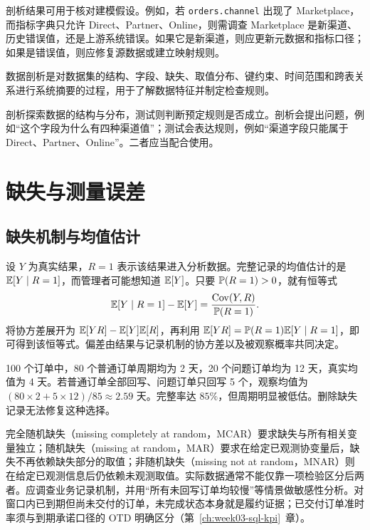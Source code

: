 剖析结果可用于核对建模假设。例如，若 \texttt{orders.channel} 出现了 Marketplace，而指标字典只允许 Direct、Partner、Online，则需调查 Marketplace 是新渠道、历史错误值，还是上游系统错误。如果它是新渠道，则应更新元数据和指标口径；如果是错误值，则应修复源数据或建立映射规则。

\begin{definition}[数据剖析]
数据剖析是对数据集的结构、字段、缺失、取值分布、键约束、时间范围和跨表关系进行系统摘要的过程，用于了解数据特征并制定检查规则。
\end{definition}

剖析探索数据的结构与分布，测试则判断预定规则是否成立。剖析会提出问题，例如“这个字段为什么有四种渠道值”；测试会表达规则，例如“渠道字段只能属于 Direct、Partner、Online”。二者应当配合使用。

\section{缺失与测量误差}

\subsection{缺失机制与均值估计}
设 \(Y\) 为真实结果，\(R=1\) 表示该结果进入分析数据。完整记录的均值估计的是 \(\mathbb E[Y\mid R=1]\)，而管理者可能想知道 \(\mathbb E[Y]\)。只要 \(\mathbb P(R=1)>0\)，就有恒等式
\[
\mathbb E[Y\mid R=1]-\mathbb E[Y]
=\frac{\operatorname{Cov}(Y,R)}{\mathbb P(R=1)}.
\]
将协方差展开为 \(\mathbb E[YR]-\mathbb E[Y]\mathbb E[R]\)，再利用 \(\mathbb E[YR]=\mathbb P(R=1)\mathbb E[Y\mid R=1]\)，即可得到该恒等式。偏差由结果与记录机制的协方差以及被观察概率共同决定。

\begin{example}[慢订单更容易缺失]
100 个订单中，80 个普通订单周期均为 2 天，20 个问题订单均为 12 天，真实均值为 4 天。若普通订单全部回写、问题订单只回写 5 个，观察均值为 \((80\times2+5\times12)/85\approx2.59\) 天。完整率达 \(85\%\)，但周期明显被低估。删除缺失记录无法修复这种选择。
\end{example}

完全随机缺失（missing completely at random，MCAR）要求缺失与所有相关变量独立；随机缺失（missing at random，MAR）要求在给定已观测协变量后，缺失不再依赖缺失部分的取值；非随机缺失（missing not at random，MNAR）则在给定已观测信息后仍依赖未观测取值。实际数据通常不能仅靠一项检验区分后两者。应调查业务记录机制，并用“所有未回写订单均较慢”等情景做敏感性分析。对窗口内已到期但尚未交付的订单，未完成状态本身就是履约证据；已交付订单准时率须与到期承诺口径的 OTD 明确区分（第~\ref{ch:week03-sql-kpi}~章）。

